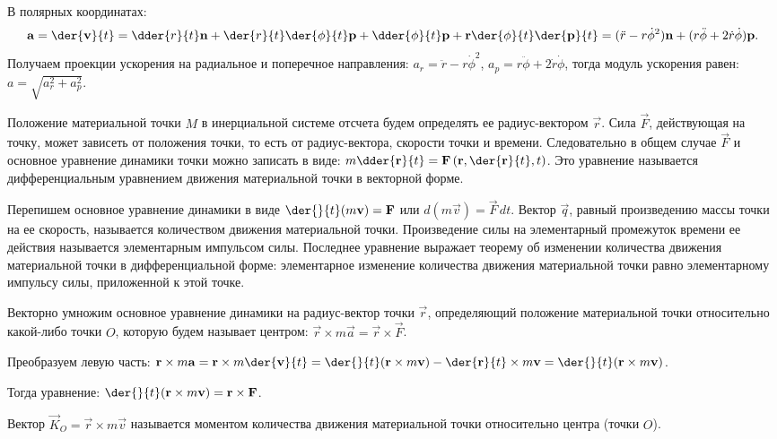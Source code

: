 В полярных координатах:
\[
    \vec{a} = \der{\vec{v}}{t} = \dder{r}{t}\vec{n} + \der{r}{t}\der{\phi}{t}
    \vec{p} + \dder{\phi}{t}\vec{p} + \vec{r}\der{\phi}{t}\der{\vec{p}}{t} =
    (\ddot{r}-r\dot{\phi}^2)\vec{n} + (r\ddot{\phi}+2\dot{r}\dot{\phi})\vec{p}.
\]
Получаем проекции ускорения на радиальное и поперечное направления:
\( a_r = \ddot{r}-r\dot{\phi}^2 \), \( a_p = r\ddot{\phi}+2\dot{r}\dot{\phi} \),
тогда модуль ускорения равен: \( a = \sqrt{a_r^2 + a_p^2} \).

Положение материальной точки \( M \) в инерциальной системе отсчета будем
определять ее радиус-вектором \( \vec{r} \). Сила \( \vec{F} \), действующая на
точку, может зависеть от положения точки, то есть от радиус-вектора, скорости
точки и времени. Следовательно в общем случае \( \vec{F} \) и основное уравнение
динамики точки можно записать в виде: \( \ds m\dder{\vec{r}}{t} =
\vec{F}\left(\vec{r}, \der{\vec{r}}{t}, t\right) \).
Это уравнение называется дифференциальным уравнением движения материальной точки
в векторной форме.

Перепишем основное уравнение динамики в виде
\( \ds \der{}{t}(m\vec{v}) = \vec{F} \) или \( d(m\vec{v}) = \vec{F}\,dt \).
Вектор \( \vec{q} \), равный произведению массы точки на ее скорость, называется
количеством движения материальной точки. Произведение силы на элементарный
промежуток времени ее действия называется элементарным импульсом силы. Последнее
уравнение выражает теорему об изменении количества движения материальной точки в
дифференциальной форме: элементарное изменение количества движения материальной
точки равно элементарному импульсу силы, приложенной к этой точке.

Векторно умножим основное уравнение динамики на радиус-вектор точки
\( \vec{r} \), определяющий положение материальной точки относительно какой-либо
точки \( O \), которую будем называет центром:
\( \vec{r}\times m\vec{a} = \vec{r}\times\vec{F} \).

Преобразуем левую часть: \( \ds \vec{r}\times m\vec{a} = \vec{r}\times
m\der{\vec{v}}{t} = \der{}{t}(\vec{r}\times m\vec{v}) - \der{\vec{r}}{t}\times
m\vec{v} = \der{}{t}(\vec{r}\times m\vec{v}) \).

Тогда уравнение:
\( \ds \der{}{t}(\vec{r}\times m\vec{v}) = \vec{r}\times\vec{F} \).

Вектор \( \vec{K}_O = \vec{r}\times m\vec{v} \) называется моментом количества
движения материальной точки относительно центра (точки \( O \)).

